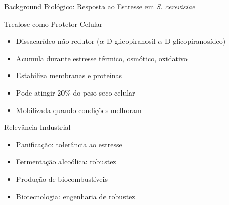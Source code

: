 \begin{frame}{Background Biológico: Resposta ao Estresse em \textit{S. cerevisiae}}
\begin{block}{Trealose como Protetor Celular}
\begin{itemize}
    \item Dissacarídeo não-redutor ($\alpha$-D-glicopiranosil-$\alpha$-D-glicopiranosídeo)
    \item Acumula durante estresse térmico, osmótico, oxidativo
    \item Estabiliza membranas e proteínas
    \item Pode atingir 20\% do peso seco celular
    \item Mobilizada quando condições melhoram
\end{itemize}
\end{block}

\vspace{0.3cm}

\begin{exampleblock}{Relevância Industrial}
\begin{itemize}
    \item Panificação: tolerância ao estresse
    \item Fermentação alcoólica: robustez
    \item Produção de biocombustíveis
    \item Biotecnologia: engenharia de robustez
\end{itemize}
\end{exampleblock}
\end{frame}

